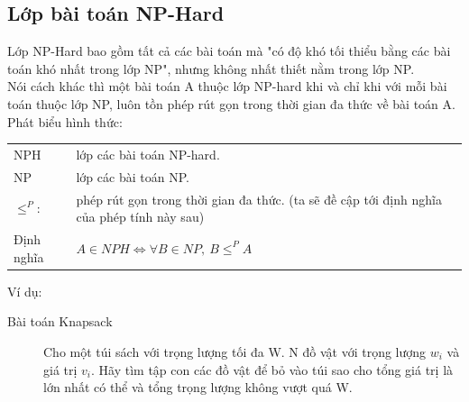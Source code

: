 \documentclass[a4paper 14pt]{extarticle}
\begin{document}
		\subsection{Lớp bài toán NP-Hard}
			Lớp NP-Hard bao gồm tất cả các bài toán mà "có độ khó tối thiểu bằng các bài toán khó nhất trong lớp NP", nhưng không nhất thiết nằm trong lớp NP.\\
			Nói cách khác thì một bài toán A thuộc lớp NP-hard khi và chỉ khi với mỗi bài toán thuộc lớp NP, luôn tồn phép rút gọn trong thời gian đa thức về bài toán A.\\
			Phát biểu hình thức:
			\begin{addmargin}{0.5in}
				\begin{tabular}{l p{4in}}
				NPH& lớp các bài toán NP-hard.\\
				NP& lớp các bài toán NP.\\
				$\leq^{P}:$& phép rút gọn trong thời gian đa thức. (ta sẽ đề cập tới định nghĩa của phép tính này sau)\\
				Định nghĩa&$A \in NPH \Leftrightarrow \forall B \in NP,~ B \leq^{P} A$
				\end{tabular}
			\end{addmargin}
			Ví dụ:
			\begin{description}
				\item[Bài toán Knapsack]  Cho một túi sách với trọng lượng tối đa W. N đồ vật với trọng lượng $w_{i}$ và giá trị $v_{i}$. Hãy tìm tập con các đồ vật để bỏ vào túi sao cho tổng giá trị là lớn nhất có thể và tổng trọng lượng không vượt quá W.
			\end{description}
\end{document}

